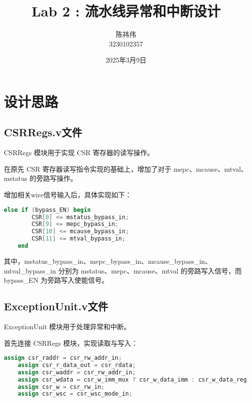 \documentclass{article}
\author{陈祎伟\\3230102357}
\title{Lab 2 : 流水线异常和中断设计}
\date{2025年3月9日}
\begin{document}
\maketitle
\section{设计思路}
\subsection{CSRRegs.v文件}
CSRRegs 模块用于实现 CSR 寄存器的读写操作。\par
在原先 CSR 寄存器读写指令实现的基础上，增加了对于 mepc、mcause、mtval、mstatus 的旁路写操作。\par
增加相关wire信号输入后，具体实现如下：\par
\begin{lstlisting}[language=Verilog]
    else if (bypass_EN) begin
        CSR[0] <= mstatus_bypass_in;
        CSR[9] <= mepc_bypass_in;
        CSR[10] <= mcause_bypass_in;
        CSR[11] <= mtval_bypass_in;
    end
\end{lstlisting}

其中，mstatus\_bypass\_in、mepc\_bypass\_in、mcause\_bypass\_in、mtval\_bypass\_in 分别为 mstatus、mepc、mcause、mtval 的旁路写入信号，而 bypass\_EN 为旁路写入使能信号。\par

\subsection{ExceptionUnit.v文件}
ExceptionUnit 模块用于处理异常和中断。\par
首先连接 CSRRegs 模块，实现读取与写入：\par
\begin{lstlisting}[language=Verilog]
    assign csr_raddr = csr_rw_addr_in;
    assign csr_r_data_out = csr_rdata;
    assign csr_waddr = csr_rw_addr_in;
    assign csr_wdata = csr_w_imm_mux ? csr_w_data_imm : csr_w_data_reg;
    assign csr_w = csr_rw_in;
    assign csr_wsc = csr_wsc_mode_in;
\end{lstlisting}
\end{document}
